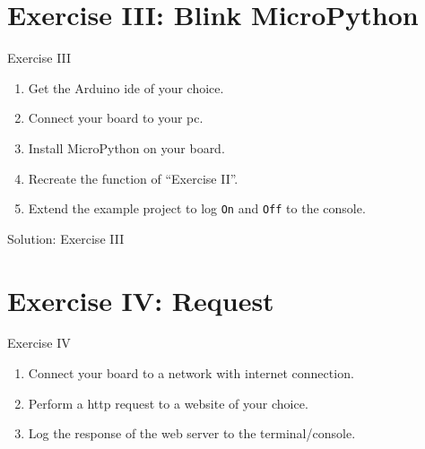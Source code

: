 \documentclass[aspectratio=169]{beamer}
\begin{document}
\section{Exercise III: Blink MicroPython}

\begin{frame}
    \begin{exampleblock}{Exercise III}
        \begin{enumerate}
            \item Get the Arduino\textregistered{} \acs{ide} of your choice.
            \item Connect your board to your \acs{pc}.
            \item Install MicroPython on your board.
            \item Recreate the function of ``Exercise II''.
            \item Extend the example project to log \texttt{On} and \texttt{Off} to the console.%
        \end{enumerate}
    \end{exampleblock}
\end{frame}

\begin{frame}{Solution: Exercise III}
    \begin{listing}[H]
        \caption{Solution for Exercise III.}
        \label{lst:arduino:exercise:3:solution}
    \end{listing}
\end{frame}

\section{Exercise IV:  Request}

\begin{frame}
    \begin{exampleblock}{Exercise IV}
        \begin{enumerate}
            \item Connect your board to a network with internet connection.
            \item Perform a \acs{http} request to a website of your choice.
            \item Log the response of the web server to the terminal/console.
        \end{enumerate}
    \end{exampleblock}
\end{frame}
\end{document}
